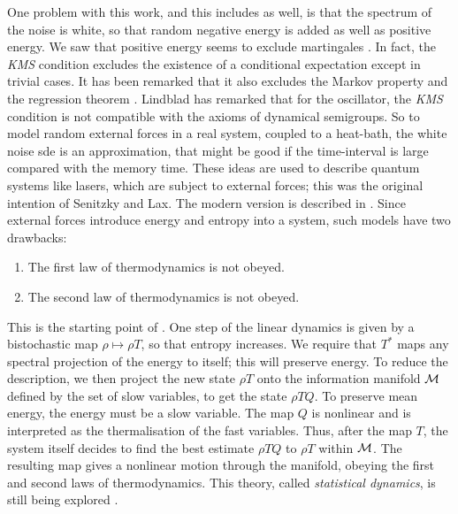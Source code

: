 One problem with this work, and this includes \cite{Barnett}
as well, is that the spectrum of the noise is white, so that random
negative energy is added as well as positive energy.
We saw that positive energy seems to exclude martingales
\cite{Senitzky,RFS5}. In fact, the {\em KMS} condition excludes the existence
of a conditional expectation except in trivial cases. It has been remarked
that it also excludes the Markov property and the regression theorem
\cite{Talkner}. Lindblad has remarked \cite{Lindblad2} that for the
oscillator, the {\em KMS} condition is not compatible with the axioms of
dynamical semigroups. So to model random external forces in a real system,
coupled to a heat-bath, the white noise sde is an approximation, that
might be good if the time-interval is large compared with the memory time.
These ideas are used
to describe quantum systems like lasers, which are subject to external
forces; this was the original intention of Senitzky and Lax. The
modern version is described in \cite{Alicki}. Since external forces
introduce energy and entropy into a system, such models have two
drawbacks:
\begin{enumerate}
\item The first law of thermodynamics is not obeyed.
\item The second law of thermodynamics is not obeyed.
\end{enumerate}
This is the starting point of \cite{AlickiM,Balian,Streater}.
One step of the linear dynamics is given by a bistochastic map
$\rho\mapsto\rho T$, so that entropy increases. We require that $T^*$ maps
any spectral projection of the energy to itself; this will preserve energy.
To reduce the description, we then project the
new state $\rho T$ onto the information manifold ${\cal M}$ defined by
the set of slow variables, to get the state $\rho TQ$.
To preserve mean energy, the energy must be a slow variable. The map $Q$
is nonlinear and is interpreted as the thermalisation of the fast
variables. Thus, after the map $T$, the system itself decides to find the
best estimate $\rho TQ$ to $\rho T$ within ${\cal M}$. The resulting map
gives a nonlinear motion through the manifold, obeying the first and second
laws of thermodynamics. This theory, called {\em statistical dynamics},
is still being explored \cite{RFS1,RFS7,Streater}.





